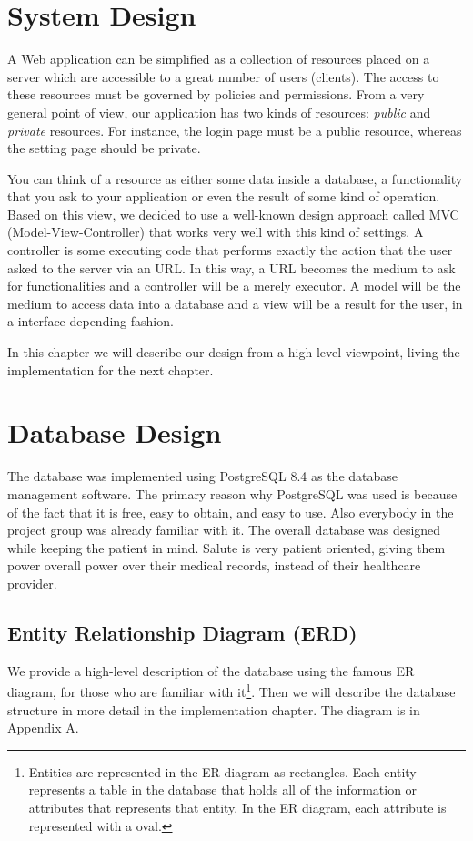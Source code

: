 \documentclass[12pt]{report}
\begin{document}
\section{System Design}
A Web application can be simplified as a collection of resources placed on a server which are accessible to a great number of users (clients). The access to these resources must be governed by policies and permissions. From a very general point of view, our application has two kinds of resources: \emph{public} and \emph{private} resources. For instance, the login page must be a public resource, whereas the setting page should be private.

You can think of a resource as either some data inside a database, a functionality that you ask to your application or even the result of some kind of operation. Based on this view, we decided to use a well-known design approach called MVC (Model-View-Controller) that works very well with this kind of settings. A controller is some executing code that performs exactly the action that the user asked to the server via an URL. In this way, a URL becomes the medium to ask for functionalities and a controller will be a merely executor. A model will be the medium to access data into a database and a view will be a result for the user, in a interface-depending fashion.

In this chapter we will describe our design from a high-level viewpoint, living the implementation for the next chapter.

\section{Database Design}
The database was implemented using PostgreSQL 8.4 as the database management software.  The primary reason why PostgreSQL was used is because of the fact that it is free, easy to obtain, and easy to use. Also everybody in the project group was already familiar with it.
The overall database was designed while keeping the patient in mind.  Salute is very patient oriented, giving them power overall  power over their medical records, instead of their healthcare provider.

\subsection{Entity Relationship Diagram (ERD)}
We provide a high-level description of the database using the famous ER diagram, for those who are familiar with it\footnote{Entities are represented in the ER diagram as rectangles.  Each entity represents a table in the database that holds all of the information or attributes that represents that entity.  In the ER diagram, each attribute is represented with a oval.}. Then we will describe the database structure in more detail in the implementation chapter. The diagram is in Appendix A.
\end{document}
